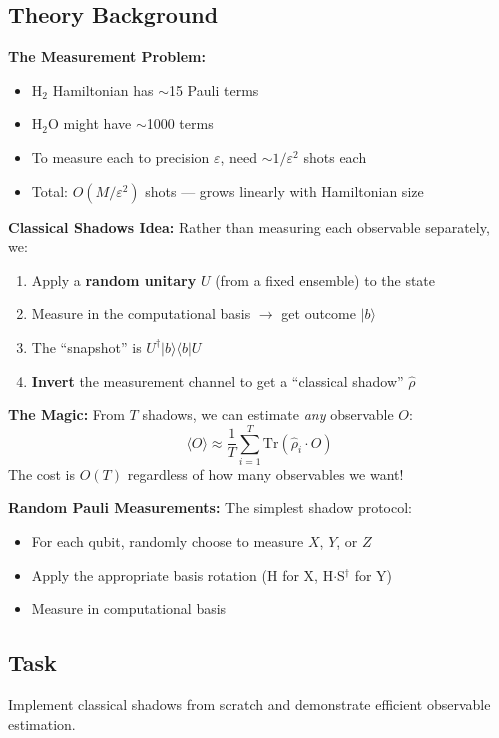 \documentclass[11pt,a4paper]{article}
\begin{document}
\subsection*{Theory Background}
\textbf{The Measurement Problem:}
\begin{itemize}
    \item H$_2$ Hamiltonian has $\sim$15 Pauli terms
    \item H$_2$O might have $\sim$1000 terms
    \item To measure each to precision $\varepsilon$, need $\sim 1/\varepsilon^2$ shots each
    \item Total: $O(M/\varepsilon^2)$ shots --- grows linearly with Hamiltonian size
\end{itemize}

\textbf{Classical Shadows Idea:}
Rather than measuring each observable separately, we:
\begin{enumerate}
    \item Apply a \textbf{random unitary} $U$ (from a fixed ensemble) to the state
    \item Measure in the computational basis $\to$ get outcome $|b\rangle$
    \item The ``snapshot'' is $U^\dagger |b\rangle \langle b| U$
    \item \textbf{Invert} the measurement channel to get a ``classical shadow'' $\hat{\rho}$
\end{enumerate}

\textbf{The Magic:} From $T$ shadows, we can estimate \textit{any} observable $O$:
\[
\langle O \rangle \approx \frac{1}{T} \sum_{i=1}^T \text{Tr}(\hat{\rho}_i \cdot O)
\]
The cost is $O(T)$ regardless of how many observables we want!

\textbf{Random Pauli Measurements:} The simplest shadow protocol:
\begin{itemize}
    \item For each qubit, randomly choose to measure $X$, $Y$, or $Z$
    \item Apply the appropriate basis rotation (H for X, H$\cdot$S$^\dagger$ for Y)
    \item Measure in computational basis
\end{itemize}

\subsection*{Task}
Implement classical shadows from scratch and demonstrate efficient observable estimation.
\end{document}
